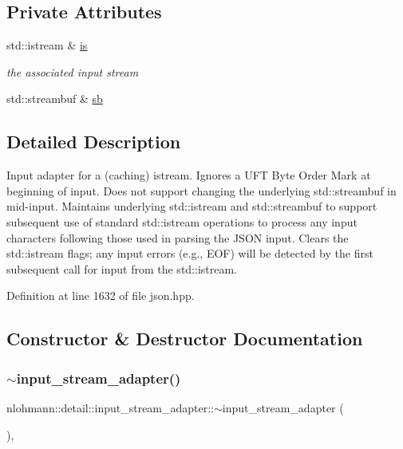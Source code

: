 \subsection*{Private Attributes}
\begin{DoxyCompactItemize}
\item 
std\+::istream \& \hyperlink{classnlohmann_1_1detail_1_1input__stream__adapter_ac3afada8eaf7d6cd2b475a3388d5e992}{is}
\begin{DoxyCompactList}\small\item\em the associated input stream \end{DoxyCompactList}\item 
std\+::streambuf \& \hyperlink{classnlohmann_1_1detail_1_1input__stream__adapter_addd96de4b5cbd9925ed5d8a0f0261143}{sb}
\end{DoxyCompactItemize}


\subsection{Detailed Description}
Input adapter for a (caching) istream. Ignores a U\+FT Byte Order Mark at beginning of input. Does not support changing the underlying std\+::streambuf in mid-\/input. Maintains underlying std\+::istream and std\+::streambuf to support subsequent use of standard std\+::istream operations to process any input characters following those used in parsing the J\+S\+ON input. Clears the std\+::istream flags; any input errors (e.\+g., E\+OF) will be detected by the first subsequent call for input from the std\+::istream. 

Definition at line 1632 of file json.\+hpp.



\subsection{Constructor \& Destructor Documentation}
\mbox{\label{classnlohmann_1_1detail_1_1input__stream__adapter_a2d71eb469267abd864f765481d1e823f}} 
\subsubsection{\texorpdfstring{$\sim$input\+\_\+stream\+\_\+adapter()}{~input\_stream\_adapter()}}
{\footnotesize\ttfamily nlohmann\+::detail\+::input\+\_\+stream\+\_\+adapter\+::$\sim$input\+\_\+stream\+\_\+adapter (\begin{DoxyParamCaption}{ }\end{DoxyParamCaption})\hspace{0.3cm}{\ttfamily [inline]}, {\ttfamily [override]}}



